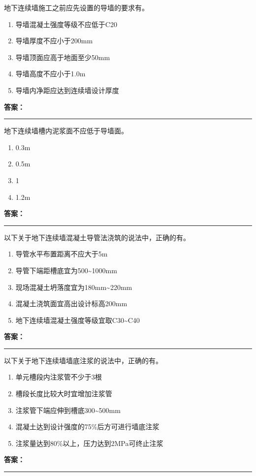 \documentclass[UTF8,fontset=fandol,11pt]{ctexart}
\newcommand{\answerline}{\textcolor{answerred}{\rule{2.4cm}{0.7pt}}}
\begin{document}
\begin{quizbox}[title={第 4 题}]
地下连续墙施工之前应先设置的导墙的要求有。\\
\begin{enumerate}[label=\Alph*.]
\item 导墙混凝土强度等级不应低于C20
\item 导墙厚度不应小于200mm
\item 导墙顶面应高于地面至少50mm
\item 导墙高度不应小于1.0m
\item 导墙内净距应达到连续墙设计厚度
\end{enumerate}
\textbf{\textcolor{answerred}{答案：}} \answerline
\end{quizbox}

\begin{quizbox}[title={第 5 题}]
地下连续墙槽内泥浆面不应低于导墙面。\\
\begin{enumerate}[label=\Alph*.]
\item 0.3m
\item 0.5m
\item 1
\item 1.2m
\end{enumerate}
\textbf{\textcolor{answerred}{答案：}} \answerline
\end{quizbox}

\begin{quizbox}[title={第 6 题}]
以下关于地下连续墙混凝土导管法浇筑的说法中，正确的有。\\
\begin{enumerate}[label=\Alph*.]
\item 导管水平布置距离不应大于5m
\item 导管下端距槽底宜为500\textasciitilde{}1000mm
\item 现场混凝土坍落度宜为180mm\textasciitilde{}220mm
\item 混凝土浇筑面宜高出设计标高200mm
\item 地下连续墙混凝土强度等级宜取C30\textasciitilde{}C40
\end{enumerate}
\textbf{\textcolor{answerred}{答案：}} \answerline
\end{quizbox}

\begin{quizbox}[title={第 7 题}]
以下关于地下连续墙墙底注浆的说法中，正确的有。\\
\begin{enumerate}[label=\Alph*.]
\item 单元槽段内注浆管不少于3根
\item 槽段长度比较大时宜增加注浆管
\item 注浆管下端应伸到槽底300\textasciitilde{}500mm
\item 混凝土达到设计强度的75\%后方可进行墙底注浆
\item 注浆量达到80\%以上，压力达到2MPa可终止注浆
\end{enumerate}
\textbf{\textcolor{answerred}{答案：}} \answerline
\end{quizbox}
\end{document}

